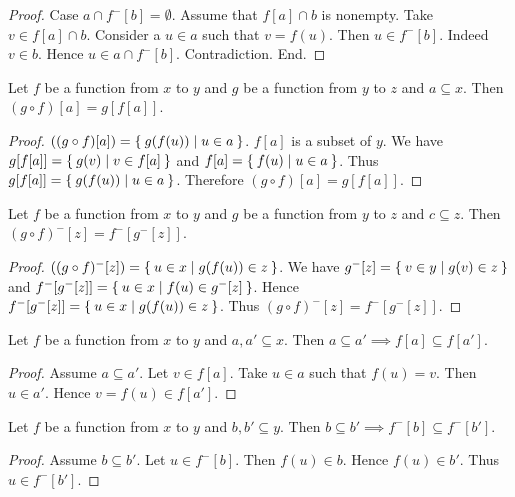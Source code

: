 \documentclass[../../sets-and-functions.ftl.tex]{subfiles}
\begin{document}
\begin{forthel}
\begin{proof}
      Case $a \cap f^{-}[b] = \emptyset$.
        Assume that $f[a] \cap b$ is nonempty.
        Take $v \in f[a] \cap b$.
        Consider a $u \in a$ such that $v = f(u)$.
        Then $u \in f^{-}[b]$.
        Indeed $v \in b$.
        Hence $u \in a \cap f^{-}[b]$.
        Contradiction.
      End.
    \end{proof}

    \begin{proposition}[SF 02 02 522811]
      Let $f$ be a function from $x$ to $y$ and $g$ be a function from $y$ to $z$ and $a \subseteq x$.
      Then $(g \circ f)[a] = g[f[a]]$.
    \end{proposition}
    \begin{proof}
      $((g \circ f)[a]) = \Set{g(f(u)) | u \in a}$.
      $f[a]$ is a subset of $y$.
      We have $g[f[a]] = \Set{g(v) | v \in f[a]}$ and $f[a] = \Set{f(u) | u \in a}$.
      Thus $g[f[a]] = \Set{g(f(u)) | u \in a}$.
      Therefore $(g \circ f)[a] = g[f[a]]$.
    \end{proof}

    \begin{proposition}[SF 02 02 819065]
      Let $f$ be a function from $x$ to $y$ and $g$ be a function from $y$ to $z$ and $c \subseteq z$.
      Then $(g \circ f)^{-}[z] = f^{-}[g^{-}[z]]$.
    \end{proposition}
    \begin{proof}
      $((g \circ f)^{-}[z]) = \Set{u \in x | g(f(u)) \in z}$.
      We have $g^{-}[z] = \Set{v \in y | g(v) \in z}$ and $f^{-}[g^{-}[z]] = \Set{u \in x | f(u) \in g^{-}[z]}$.
      Hence $f^{-}[g^{-}[z]] = \Set{u \in x | g(f(u)) \in z}$.
      Thus $(g \circ f)^{-}[z] = f^{-}[g^{-}[z]]$.
    \end{proof}

    \begin{proposition}[SF 02 02 889945]
      Let $f$ be a function from $x$ to $y$ and $a,a' \subseteq x$.
      Then $a \subseteq a' \implies f[a] \subseteq f[a']$.
    \end{proposition}
    \begin{proof}
      Assume $a \subseteq a'$.
      Let $v \in f[a]$.
      Take $u \in a$ such that $f(u) = v$.
      Then $u \in a'$.
      Hence $v = f(u) \in f[a']$.
    \end{proof}

    \begin{proposition}[SF 02 02 514409]
      Let $f$ be a function from $x$ to $y$ and $b,b' \subseteq y$.
      Then $b \subseteq b' \implies f^{-}[b] \subseteq f^{-}[b']$.
    \end{proposition}
    \begin{proof}
      Assume $b \subseteq b'$.
      Let $u \in f^{-}[b]$.
      Then $f(u) \in b$.
      Hence $f(u) \in b'$.
      Thus $u \in f^{-}[b']$.
    \end{proof}


\end{forthel}
\end{document}
